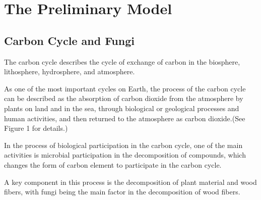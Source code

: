 \documentclass[12pt]{article}
\begin{document}
%

\section{The Preliminary Model}
\subsection{Carbon Cycle and Fungi}
The carbon cycle describes the cycle of exchange of carbon in the biosphere, lithosphere, hydrosphere, and atmosphere.\par 

As one of the most important cycles on Earth, the process of the carbon cycle can be described as the absorption of carbon dioxide from the atmosphere by plants on land and in the sea, through biological or geological processes and human activities, and then returned to the atmosphere as carbon dioxide.(See Figure 1 for details.)\par


In the process of biological participation in the carbon cycle, one of the main activities is microbial participation in the decomposition of compounds, which changes the form of carbon element to participate in the carbon cycle.\par 

A key component in this process is the decomposition of plant material and wood fibers\cite{11}, with fungi being the main factor in the decomposition of wood fibers.\\

\end{document}
